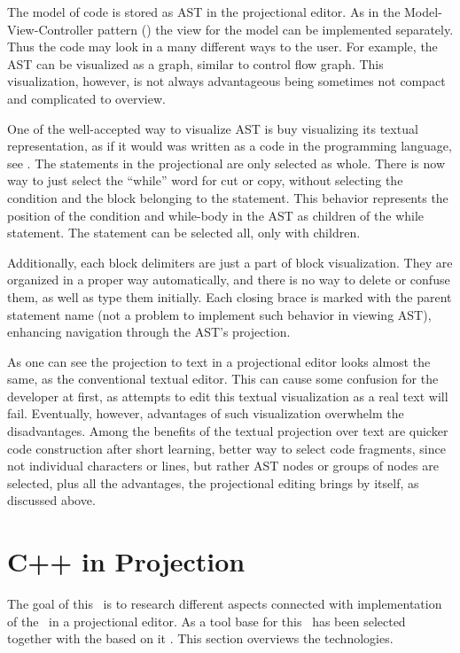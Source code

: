 The model of code is stored as AST in the projectional editor. As in the Model-View-Controller pattern (\cite{GOF95}) the view for
the model can be implemented separately. Thus the code may look in a many different ways to the user. For example, the AST can be
visualized as a graph, similar to control flow graph. This visualization, however, is not always advantageous being sometimes not compact and
complicated to overview.


One of the well-accepted way to visualize AST is buy visualizing its textual representation, as if it would was written 
as a code in the programming language, see . The statements in the projectional are only selected as whole.
There is now way to just select the ``while'' word for cut or copy, without selecting the condition and the block belonging
to the statement. This behavior represents the position of the condition and while-body in the AST as children of the while
statement. The statement can be selected all, only with children.

Additionally, each block delimiters are just a part of block visualization. They are organized in a proper way automatically,
and there is no way to delete or confuse them, as well as type them initially. Each closing brace is marked with the 
parent statement name (not a problem to implement such behavior in viewing AST), enhancing navigation through the AST's projection.

As one can see the projection to text in a projectional editor looks almost the same, as the conventional textual editor.
This can cause some confusion for the developer at first, as attempts to edit this textual visualization as a real text
will fail. Eventually, however, advantages of such visualization overwhelm the disadvantages. Among the benefits of the 
textual projection over text are quicker code construction after short learning, better way to select code fragments,
since not individual characters or lines, but rather AST nodes or groups of nodes are selected, plus all the advantages,
the projectional editing brings by itself, as discussed above.


\section{C++ in Projection}

The goal of this \MT\ is to research different aspects connected with implementation of the \cpppl\ in a projectional editor.
As a tool base for this \jbmps\ has been selected together with the based on it \mbdrp. This section overviews the technologies.

